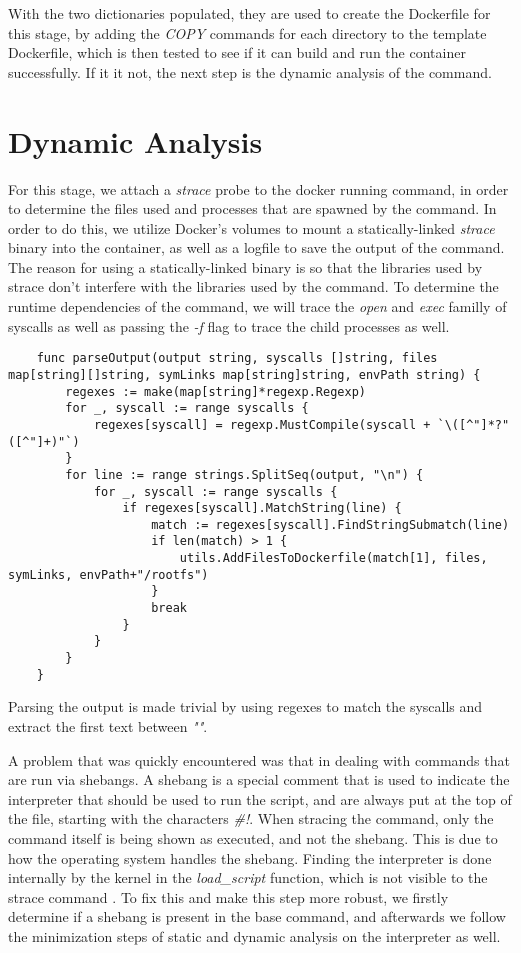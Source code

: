 With the two dictionaries populated, they are used to create the Dockerfile for this stage, by adding the \textit{COPY} commands for each directory to 
the template Dockerfile, which is then tested to see if it can build and run the container successfully. If it it not, the next step is the dynamic analysis of the command.

\section{Dynamic Analysis}
For this stage, we attach a \textit{strace} probe to the docker running command, in order to determine the files used and processes that are spawned by the command.
In order to do this, we utilize Docker's volumes to mount a statically-linked \textit{strace} binary into the container, as well as a logfile to save the output of the command.
The reason for using a statically-linked binary is so that the libraries used by strace don't interfere with the libraries used by the command.
To determine the runtime dependencies of the command, we will trace the \textit{open} and \textit{exec} familly of syscalls \cite{identify-dependencies} as well as passing the \textit{-f} flag
to trace the child processes as well.

\lstset{language=Go,caption=File util functions,label=lst:file-functions}
\begin{lstlisting}
    func parseOutput(output string, syscalls []string, files map[string][]string, symLinks map[string]string, envPath string) {
        regexes := make(map[string]*regexp.Regexp)
        for _, syscall := range syscalls {
            regexes[syscall] = regexp.MustCompile(syscall + `\([^"]*?"([^"]+)"`)
        }
        for line := range strings.SplitSeq(output, "\n") {
            for _, syscall := range syscalls {
                if regexes[syscall].MatchString(line) {
                    match := regexes[syscall].FindStringSubmatch(line)
                    if len(match) > 1 {
                        utils.AddFilesToDockerfile(match[1], files, symLinks, envPath+"/rootfs")
                    }
                    break
                }
            }
        }
    }
\end{lstlisting}

Parsing the output is made trivial by using regexes to match the syscalls and extract the first text between \textit{""}.

A problem that was quickly encountered was that in dealing with commands that are run via shebangs.
A shebang is a special comment that is used to indicate the interpreter that should be used to run the script, and are always 
put at the top of the file, starting with the characters \textit{\#!}.
When stracing the command, only the command itself is being shown as executed, and not the shebang. This is due 
to how the operating system handles the shebang. Finding the interpreter is done internally by the kernel in the
\textit{load_script} function, which is not visible to the strace command \cite{demystifyng-shebangs}. 
To fix this and make this step more robust, we firstly determine if a shebang is present in the base command, and afterwards 
we follow the minimization steps of static and dynamic analysis on the interpreter as well.

